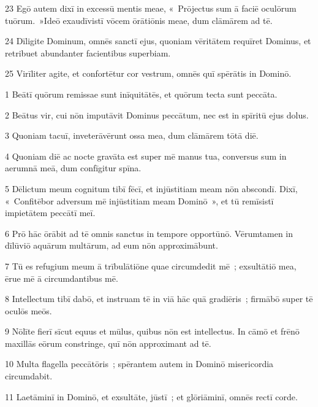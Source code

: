 \psalmVerse
  {\phantom{0}23}
  {Egō autem dixī in excessū mentis meae, «~Prōjectus sum ā faciē oculōrum tuōrum.~»Ideō exaudīvistī vōcem ōrātiōnis meae, dum clāmārem ad tē.}


\psalmVerse
  {\phantom{0}24}
  {Dīligite Dominum, omnēs sanctī ejus, quoniam vēritātem requīret Dominus, et retribuet abundanter facientibus superbiam.}


\psalmVerse
  {\phantom{0}25}
  {Virīliter agite, et confortētur cor vestrum, omnēs quī spērātis in Dominō.}



\psalmVerse
  {\phantom{00}1}
  {Beātī quōrum remissae sunt inīquitātēs, et quōrum tecta sunt peccāta.}


\psalmVerse
  {\phantom{00}2}
  {Beātus vir, cui nōn imputāvit Dominus peccātum, nec est in spīritū ejus dolus.}


\psalmVerse
  {\phantom{00}3}
  {Quoniam tacuī, inveterāvērunt ossa mea, dum clāmārem tōtā diē.}


\psalmVerse
  {\phantom{00}4}
  {Quoniam diē ac nocte gravāta est super mē manus tua, conversus sum in aerumnā meā, dum confīgitur spīna.}


\psalmVerse
  {\phantom{00}5}
  {Dēlictum meum cognitum tibī fēcī, et injūstitiam meam nōn abscondī. Dixī, «~Confitēbor adversum mē injūstitiam meam Dominō~», et tū remīsistī impietātem peccātī meī.}


\psalmVerse
  {\phantom{00}6}
  {Prō hāc ōrābit ad tē omnis sanctus in tempore opportūnō. Vērumtamen in dīlūviō aquārum multārum, ad eum nōn approximābunt.}


\psalmVerse
  {\phantom{00}7}
  {Tū es refugium meum ā trībulātiōne quae circumdedit mē~; exsultātiō mea, ērue mē ā circumdantibus mē.}


\psalmVerse
  {\phantom{00}8}
  {Intellectum tibī dabō, et instruam tē in viā hāc quā gradiēris~; firmābō super tē oculōs meōs.}


\psalmVerse
  {\phantom{00}9}
  {Nōlīte fierī sīcut equus et mūlus, quibus nōn est intellectus. In cāmō et frēnō maxillās eōrum constringe, quī nōn approximant ad tē.}


\psalmVerse
  {\phantom{0}10}
  {Multa flagella peccātōris~; spērantem autem in Dominō misericordia circumdabit.}


\psalmVerse
  {\phantom{0}11}
  {Laetāminī in Dominō, et exsultāte, jūstī~; et glōriāminī, omnēs rectī corde.}



